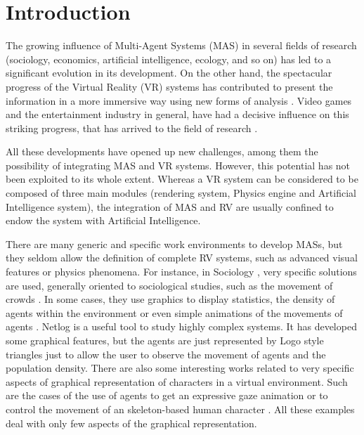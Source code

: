 \documentclass{aamas2012}
\begin{document}




\section{Introduction
\label{sec:introduction}}

The growing influence of Multi-Agent Systems (MAS) in several fields of research (sociology,
economics, artificial intelligence, ecology, and so on) has led to a significant evolution in its
development. On the other hand, the spectacular progress of the Virtual Reality (VR) systems has contributed to present the information in a more immersive way using new forms of analysis \cite{Sherman2003}. Video games and the entertainment industry in general, have had a decisive influence on this
striking progress, that has arrived to the field of research \cite{Rhyne2000, Novak2007}. 

All these developments have opened up new challenges, among them the possibility of integrating MAS and VR systems. However, this potential has not been exploited to its whole extent. Whereas a VR system can be considered to be composed of three main modules (rendering system, Physics engine and Artificial Intelligence system), the integration of MAS and RV are usually confined to endow the system with Artificial Intelligence. 

There are many generic and specific work environments to develop MASs, but they seldom allow the definition of complete RV systems, such as advanced visual features or physics phenomena. For instance, in Sociology
\cite{Axelrod1997,Gilbert2008}, very specific solutions are used, generally
oriented to sociological studies, such as the movement of crowds
\cite{Ulicny2001,Reynolds2000}. In some cases, they use graphics to display statistics,
the density of agents within the environment or even simple animations of the movements of agents
\cite{Reynolds2000}. Netlog \cite{Wilensky1999} is a useful tool to study highly complex systems.
It has developed some graphical features, but the agents are just represented by Logo style triangles
just to allow the user to observe the movement of agents and the population density.
There are also some interesting works related to very specific aspects of graphical representation of characters in a virtual environment. Such are the cases of the use of agents to get an expressive gaze animation \cite{Thiebaux2009} or to control the movement of an skeleton-based human character \cite{Chiu2011}. All these examples deal with only few aspects of the graphical representation.
\end{document}
